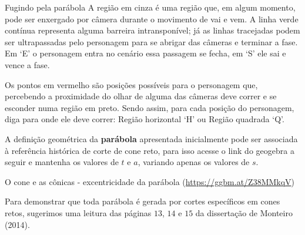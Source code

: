 \begin{task}{Fugindo pela parábola}
A região em cinza é uma região que, em algum momento, pode ser enxergado por câmera durante o movimento de vai e vem. A linha verde contínua representa alguma barreira intransponível; já as linhas tracejadas podem ser ultrapassadas pelo personagem para se abrigar das câmeras e terminar a fase. Em ‘E’ o personagem entra no cenário essa passagem se fecha, em ‘S’ ele sai e vence a fase.

Os pontos em vermelho são posições possíveis para o personagem que, percebendo a proximidade do olhar de alguma das câmeras deve correr e se esconder numa região em preto. Sendo assim, para cada posição do personagem, diga para onde ele deve correr: Região horizontal ‘H’ ou Região quadrada ‘Q’.
\end{task}

\begin{research}

A definição geométrica da \textbf{parábola} apresentada inicialmente pode ser associada à referência histórica de corte de cone reto, para isso acesse o link do geogebra a seguir e mantenha os valores de \(t\) e \(a\), variando apenas os valores de \(s\).

O cone e as cônicas - excentricidade da parábola (\url{https://ggbm.at/Z38MMkqV})

Para demonstrar que toda parábola é gerada por cortes específicos em cones retos, sugerimos uma leitura das páginas \(13\), \(14\) e \(15\) da dissertação de Monteiro (2014).
\end{research}

